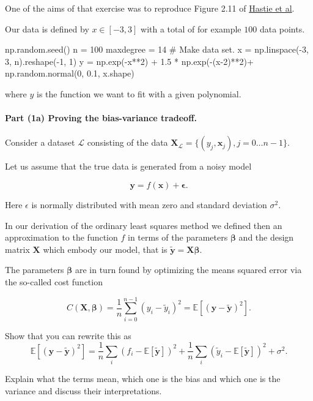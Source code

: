 \documentclass[%
oneside,                 %
final,                   %
10pt]{article}
\begin{document}
One of the aims of that exercise was 
to reproduce Figure 2.11 of \href{{https://github.com/CompPhysics/MLErasmus/blob/master/doc/Textbooks/elementsstat.pdf}}{Hastie et al}.

Our data is defined by $x\in [-3,3]$ with a total of for example $100$ data points.







\bpycod
np.random.seed()
n = 100
maxdegree = 14
# Make data set.
x = np.linspace(-3, 3, n).reshape(-1, 1)
y = np.exp(-x**2) + 1.5 * np.exp(-(x-2)**2)+ np.random.normal(0, 0.1, x.shape)

\epycod

where $y$ is the function we want to fit with a given polynomial.

\paragraph{Part (1a) Proving the bias-variance tradeoff.}
Consider a
dataset $\mathcal{L}$ consisting of the data
$\mathbf{X}_\mathcal{L}=\{(y_j, \boldsymbol{x}_j), j=0\ldots n-1\}$.

Let us assume that the true data is generated from a noisy model

\[
\bm{y}=f(\boldsymbol{x}) + \bm{\epsilon}.
\]

Here $\epsilon$ is normally distributed with mean zero and standard
deviation $\sigma^2$.

In our derivation of the ordinary least squares method we defined then
an approximation to the function $f$ in terms of the parameters
$\bm{\beta}$ and the design matrix $\bm{X}$ which embody our model,
that is $\bm{\tilde{y}}=\bm{X}\bm{\beta}$.

The parameters $\bm{\beta}$ are in turn found by optimizing the means
squared error via the so-called cost function

\[
C(\bm{X},\bm{\beta}) =\frac{1}{n}\sum_{i=0}^{n-1}(y_i-\tilde{y}_i)^2=\mathbb{E}\left[(\bm{y}-\bm{\tilde{y}})^2\right].
\]

Show that you can rewrite  this as
\[
\mathbb{E}\left[(\bm{y}-\bm{\tilde{y}})^2\right]=\frac{1}{n}\sum_i(f_i-\mathbb{E}\left[\bm{\tilde{y}}\right])^2+\frac{1}{n}\sum_i(\tilde{y}_i-\mathbb{E}\left[\bm{\tilde{y}}\right])^2+\sigma^2.
\]

Explain what the terms mean, which one is the bias and which one is
the variance and discuss their interpretations.
\end{document}
